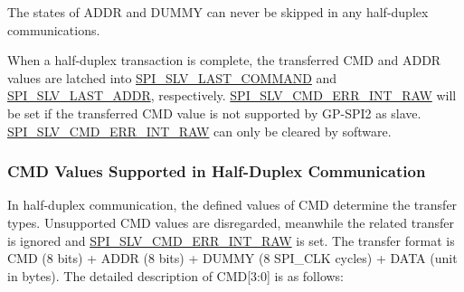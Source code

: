 \documentclass[main\_\_EN.tex]{subfiles}
\begin{document}
\begin{tiplisting}
The states of ADDR and DUMMY can never be skipped in any half-duplex communications.
\end{tiplisting}
\vspace{-1em}
When a half-duplex transaction is complete, the transferred CMD and ADDR values are latched into \hyperref[fielddesc:SPISLVLASTCOMMAND]{SPI\_SLV\_LAST\_COMMAND} and \hyperref[fielddesc:SPISLVLASTADDR]{SPI\_SLV\_LAST\_ADDR}, respectively. \hyperref[fielddesc:SPISLVCMDERRINTRAW]{SPI\_SLV\_CMD\_ERR\_INT\_RAW} will be set if the transferred CMD value is not supported by GP-SPI2 as slave. \hyperref[fielddesc:SPISLVCMDERRINTRAW]{SPI\_SLV\_CMD\_ERR\_INT\_RAW} can only be cleared by software.


\subsubsection{CMD Values Supported in Half-Duplex Communication} \label{sec:gp-spi-hd-salve-format}  

In half-duplex communication, the defined values of CMD determine the transfer types. Unsupported CMD values are disregarded, meanwhile the related transfer is ignored and \hyperref[fielddesc:SPISLVCMDERRINTRAW]{SPI\_SLV\_CMD\_ERR\_INT\_RAW} is set. The transfer format is CMD (8 bits) + ADDR (8 bits) + DUMMY (8 SPI\_CLK cycles) + DATA (unit in bytes). The detailed description of CMD[3:0] is as follows:
\end{document}
